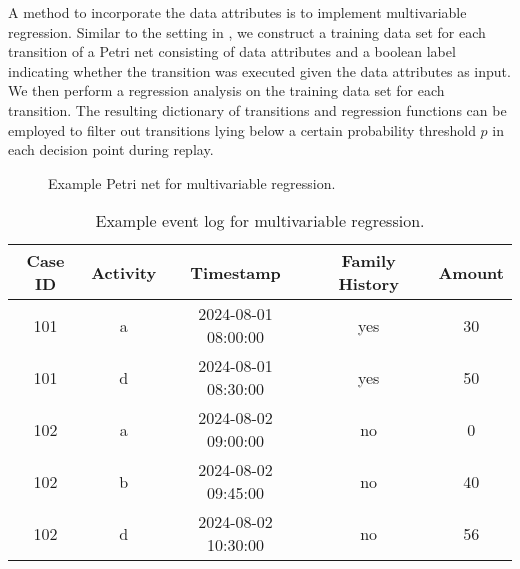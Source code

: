A method to incorporate the data attributes is to implement multivariable regression. Similar to the setting in \cite{sldpn}, we construct a training data set for each transition of a Petri net consisting of data attributes and a boolean label indicating whether the transition was executed given the data attributes as input. We then perform a regression analysis on the training data set for each transition. The resulting dictionary of transitions and regression functions can be employed to filter out transitions lying below a certain probability threshold $p$ in each decision point during replay.

\begin{figure}
    \centering
    \caption{Example Petri net for multivariable regression.}
    \label{fig:model-multivar-regression}
\end{figure}


\begin{table}[h]
    \centering
    \caption{Example event log for multivariable regression.}
    \begin{tabular}{|c|c|c|c|c|}
    \hline
    Case ID & Activity & Timestamp & Family History & Amount \\
    \hline
    101 & a & 2024-08-01 08:00:00 & yes & 30 \\
    101 & d & 2024-08-01 08:30:00 & yes & 50 \\
    102 & a & 2024-08-02 09:00:00 & no & 0 \\
    102 & b & 2024-08-02 09:45:00 & no & 40 \\
    102 & d & 2024-08-02 10:30:00 & no & 56 \\
    \hline
    \end{tabular}
    \label{tab:log-multivar-regression}
    \end{table}

